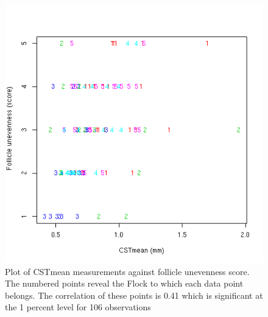 %

\begin{figure}[!h]
  \centering
  \includegraphics[width=1.0\textwidth]{CSTFu.png}
  \caption{Plot of CSTmean measurements against follicle unevenness score. The numbered points reveal the Flock to which each data point belongs. The correlation of these points is 0.41 which is significant at the 1 percent level for 106 observations}
  \label{fig:CSTFu}
\end{figure}

%

